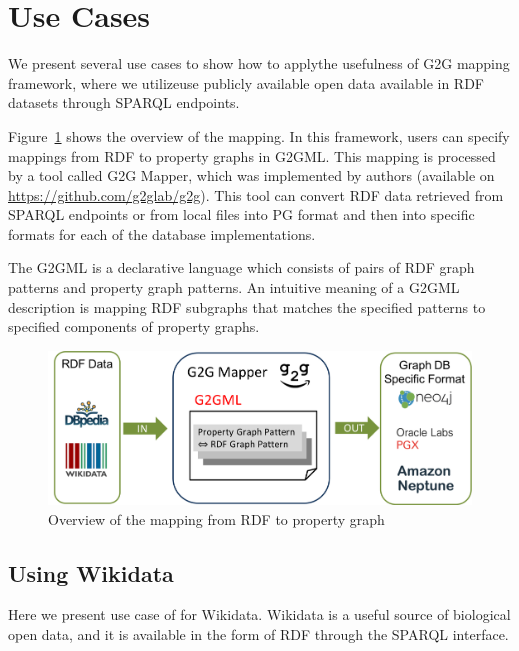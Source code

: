 \documentclass[runningheads]{llncs}
\begin{document}

\section{Use Cases}
 
We present several use cases to show how to applythe usefulness of G2G mapping framework, where we utilizeuse publicly available open data available in RDF datasets through SPARQL endpoints.
 
Figure~\ref{fig:dataflow} shows the overview of the mapping.
In this framework, users can specify mappings from RDF to property graphs in G2GML.
This mapping is processed by a tool called G2G Mapper, which was implemented by authors (available on \url{https://github.com/g2glab/g2g}). This tool can convert RDF data retrieved from SPARQL endpoints or from local files into PG format and then into specific formats for each of the database implementations.
 
The G2GML is a declarative language which consists of pairs of RDF graph patterns and property graph patterns. 
An intuitive meaning of a G2GML description is mapping RDF subgraphs that matches the specified patterns to specified components of property graphs.
 
 
\begin{figure}
\center
\includegraphics[width=1.0\textwidth]{dataflow.png}
\caption{Overview of the mapping from RDF to property graph}
\label{fig:dataflow}
\end{figure}
 
\subsection{Using Wikidata}
 
Here we present use case of for Wikidata. Wikidata is a useful source of biological open data, and it is available in the form of RDF through the SPARQL interface.
 
\end{document}
